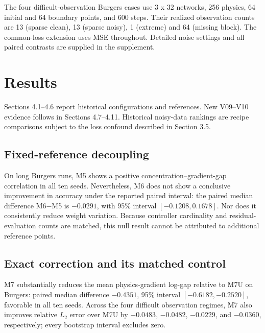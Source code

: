 \documentclass[
  11pt,
]{article}
\begin{document}
\endgroup

The four difficult-observation Burgers cases use 3 x 32 networks, 256
physics, 64 initial and 64 boundary points, and 600 steps. Their
realized observation counts are 13 (sparse clean), 13 (sparse noisy), 1
(extreme) and 64 (missing block). The common-loss extension uses MSE
throughout. Detailed noise settings and all paired contrasts are
supplied in the supplement.

\hypertarget{results}{%
\section{Results}\label{results}}

Sections 4.1--4.6 report historical configurations and references. New
V09--V10 evidence follows in Sections 4.7--4.11. Historical noisy-data
rankings are recipe comparisons subject to the loss confound described
in Section 3.5.

\hypertarget{fixed-reference-decoupling}{%
\subsection{Fixed-reference
decoupling}\label{fixed-reference-decoupling}}

On long Burgers runs, M5 shows a positive concentration--gradient-gap
correlation in all ten seeds. Nevertheless, M6 does not show a
conclusive improvement in accuracy under the reported paired interval:
the paired median difference M6−M5 is \(-0.0291\), with 95\% interval
\([-0.1208,0.1678]\). Nor does it consistently reduce weight variation.
Because controller cardinality and residual-evaluation counts are
matched, this null result cannot be attributed to additional reference
points.

\hypertarget{exact-correction-and-its-matched-control}{%
\subsection{Exact correction and its matched
control}\label{exact-correction-and-its-matched-control}}

M7 substantially reduces the mean physics-gradient log-gap relative to
M7U on Burgers: paired median difference \(-0.4351\), 95\% interval
\([-0.6182,-0.2520]\), favorable in all ten seeds. Across the four
difficult observation regimes, M7 also improves relative \(L_2\) error
over M7U by \(-0.0483\), \(-0.0482\), \(-0.0229\), and \(-0.0360\),
respectively; every bootstrap interval excludes zero.
\end{document}
